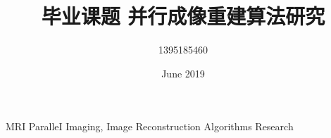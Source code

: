 \documentclass{ctexbook}
\title{毕业课题 并行成像重建算法研究}
\author{1395185460 }
\date{June 2019}
\begin{document}
\maketitle

MRI ParalleI Imaging, Image Reconstruction Algorithms Research







\end{document}
